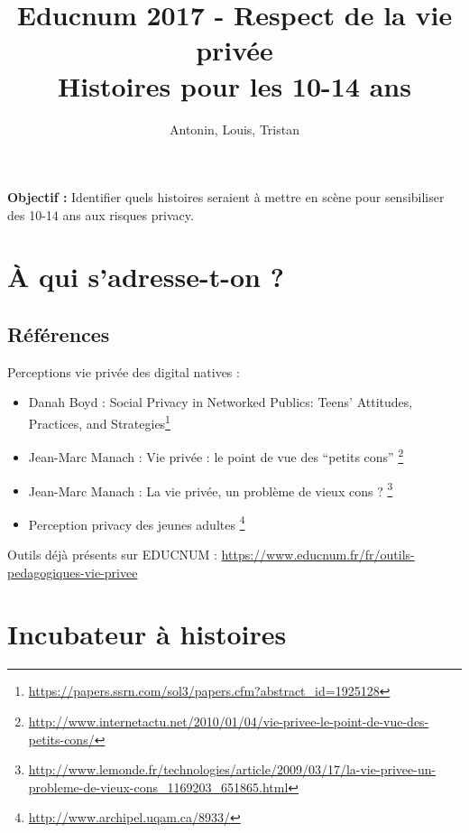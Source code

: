 \documentclass{article}
\title{Educnum 2017 - Respect de la vie privée \\
  Histoires pour les 10-14 ans}
\author{Antonin, Louis, Tristan}
\begin{document}
\maketitle 

\textbf{Objectif :} Identifier quels histoires seraient à mettre en
scène pour sensibiliser des 10-14 ans aux risques privacy. 


\section{À qui s'adresse-t-on ? }

\subsection{Références}

Perceptions vie privée des digital natives : 
\begin{itemize}

\item Danah Boyd : Social Privacy in Networked Publics: Teens’
  Attitudes, Practices, and
  Strategies\footnote{\url{https://papers.ssrn.com/sol3/papers.cfm?abstract_id=1925128}}

\item Jean-Marc Manach : Vie privée : le point de vue des ``petits
  cons''
  \footnote{\url{http://www.internetactu.net/2010/01/04/vie-privee-le-point-de-vue-des-petits-cons/}}

\item Jean-Marc Manach : La vie privée, un problème de vieux cons ?
  \footnote{\url{http://www.lemonde.fr/technologies/article/2009/03/17/la-vie-privee-un-probleme-de-vieux-cons_1169203_651865.html}}

  \item Perception privacy des jeunes
    adultes \footnote{\url{http://www.archipel.uqam.ca/8933/}}

\end{itemize}

Outils déjà présents sur EDUCNUM :
\url{https://www.educnum.fr/fr/outils-pedagogiques-vie-privee}


\section{Incubateur à histoires}
\end{document}
